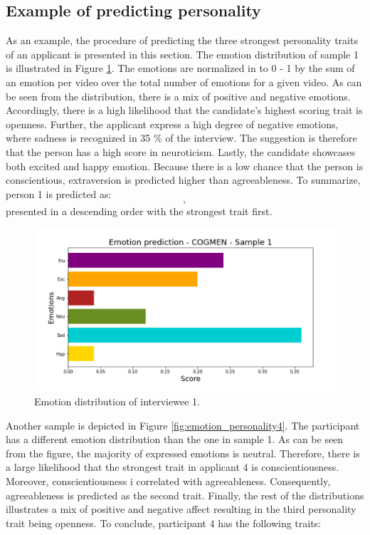 \subsection{Example of predicting personality}
As an example, the procedure of predicting the three strongest personality traits of an applicant is presented in this section. The emotion distribution of sample 1 is illustrated in Figure \ref{fig:emotion_personality1}. The emotions are normalized in to 0 - 1 by the sum of an emotion per video over the total number of emotions for a given video. As can be seen from the distribution, there is a mix of positive and negative emotions. Accordingly, there is a high likelihood that the candidate's highest scoring trait is openness. Further, the applicant express a high degree of negative emotions, where sadness is recognized in 35 \% of the interview. The suggestion is therefore that the person has a high score in neuroticism. Lastly, the candidate showcases both excited and happy emotion. Because there is a low chance that the person is conscientious, extraversion is predicted higher than agreeableness. To summarize, person 1 is predicted as:
%
\begin{equation*}
    [Conscientiousness, Neuroticism, Extraversion],
\end{equation*}
%
presented in a descending order with the strongest trait first.
%
\begin{figure}[h]
  \centering
  \includegraphics[width=\textwidth]{figures/emotion_distribution_sample1.png}
  \caption{Emotion distribution of interviewee 1.}
  \label{fig:emotion_personality1}
\end{figure}
%
\newline
\indent Another sample is depicted in Figure \ref{fig:emotion_personality4}. The participant has a different emotion distribution than the one in sample 1. As can be seen from the figure, the majority of expressed emotions is neutral. Therefore, there is a large likelihood that the strongest trait in applicant 4 is conscientiousness. Moreover, conscientiousness i correlated with agreeableness. Consequently, agreeableness is predicted as the second trait. Finally, the rest of the distributions illustrates a mix of positive and negative affect resulting in the third personality trait being openness. To conclude, participant 4 has the following traits:
